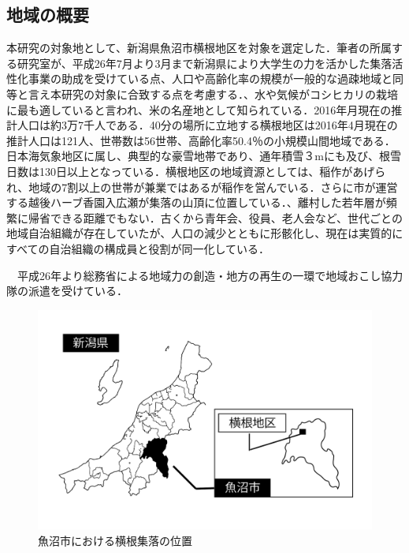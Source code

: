 \documentclass[a4paper]{jsarticle}
\begin{document}
\subsection{地域の概要}
本研究の対象地として、新潟県魚沼市横根地区を対象を選定した．筆者の所属する研究室が、平成26年7月より3月まで新潟県により大学生の力を活かした集落活性化事業の助成を受けている点、人口や高齢化率の規模が一般的な過疎地域と同等と言え本研究の対象に合致する点を考慮する．、水や気候がコシヒカリの栽培に最も適していると言われ、米の名産地として知られている．2016年月現在の推計人口は約3万7千人である．40分の場所に立地する横根地区は2016年4月現在の推計人口は121人、世帯数は56世帯、高齢化率50.4％の小規模山間地域である．日本海気象地区に属し、典型的な豪雪地帯であり、通年積雪３mにも及び、根雪日数は130日以上となっている．横根地区の地域資源としては、稲作があげられ、地域の7割以上の世帯が兼業ではあるが稲作を営んでいる．さらに市が運営する越後ハーブ香園入広瀬が集落の山頂に位置している．、離村した若年層が頻繁に帰省できる距離でもない．古くから青年会、役員、老人会など、世代ごとの地域自治組織が存在していたが、人口の減少とともに形骸化し、現在は実質的にすべての自治組織の構成員と役割が同一化している．\par
　平成26年より総務省による地域力の創造・地方の再生の一環で地域おこし協力隊の派遣を受けている．


\begin{figure}[h]
  \begin{center}
    \includegraphics[width=0.95\hsize]{./images/yokone_place.pdf}
    \caption{魚沼市における横根集落の位置}
    \label{fig:tmu_hino}
  \end{center}
\end{figure}
\end{document}
